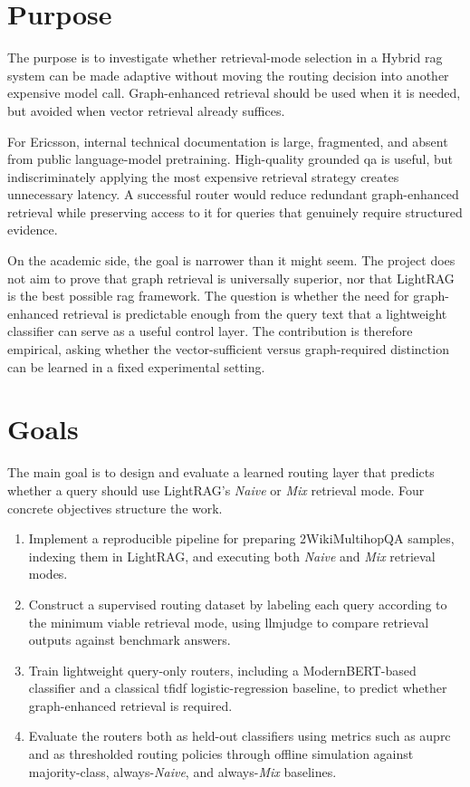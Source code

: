\documentclass[english, bibtex]{kththesis}               %
\numberwithin{listing}{chapter}
\begin{document}
\section{Purpose}
\label{sec:purpose}
The purpose is to investigate whether retrieval-mode selection in a Hybrid \gls{rag} system can be made adaptive without moving the routing decision into another expensive model call. Graph-enhanced retrieval should be used when it is needed, but avoided when vector retrieval already suffices.

For Ericsson, internal technical documentation is large, fragmented, and absent from public language-model pretraining. High-quality grounded \gls{qa} is useful, but indiscriminately applying the most expensive retrieval strategy creates unnecessary latency. A successful router would reduce redundant graph-enhanced retrieval while preserving access to it for queries that genuinely require structured evidence.

On the academic side, the goal is narrower than it might seem. The project does not aim to prove that graph retrieval is universally superior, nor that LightRAG is the best possible \gls{rag} framework. The question is whether the need for graph-enhanced retrieval is predictable enough from the query text that a lightweight classifier can serve as a useful control layer. The contribution is therefore empirical, asking whether the vector-sufficient versus graph-required distinction can be learned in a fixed experimental setting.



\section{Goals}
\label{sec:goals}
The main goal is to design and evaluate a learned routing layer that predicts whether a query should use LightRAG's \emph{Naive} or \emph{Mix} retrieval mode. Four concrete objectives structure the work.

\begin{enumerate}
\item Implement a reproducible pipeline for preparing 2WikiMultihopQA samples, indexing them in LightRAG, and executing both \emph{Naive} and \emph{Mix} retrieval modes.
\item Construct a supervised routing dataset by labeling each query according to the minimum viable retrieval mode, using \gls{llmjudge} to compare retrieval outputs against benchmark answers.
\item Train lightweight query-only routers, including a ModernBERT-based classifier and a classical \gls{tfidf} logistic-regression baseline, to predict whether graph-enhanced retrieval is required.
\item Evaluate the routers both as held-out classifiers using metrics such as \gls{auprc} and as thresholded routing policies through offline simulation against majority-class, always-\emph{Naive}, and always-\emph{Mix} baselines.
\end{enumerate}
\end{document}
